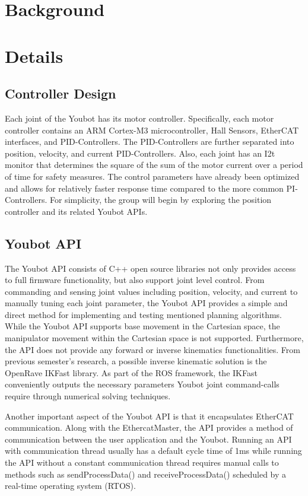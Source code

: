 \documentclass[titlepage]{article}
\begin{document}
\section{Background}
\section{Details}
\subsection{Controller Design}
Each joint of the Youbot has its motor controller. Specifically, each motor controller contains an ARM Cortex-M3 microcontroller, Hall Sensors, EtherCAT interfaces, and PID-Controllers. The PID-Controllers are further separated into position, velocity, and current PID-Controllers. Also, each joint has an I2t monitor that determines the square of the sum of the motor current over a period of time for safety measures. The control parameters have already been optimized and allows for relatively faster response time compared to the more common PI-Controllers. For simplicity, the group will begin by exploring the position controller and its related Youbot APIs.
\subsection{Youbot API}
The Youbot API consists of C++ open source libraries not only provides access to full firmware functionality, but also support joint level control. From commanding and sensing joint values including position, velocity, and current to manually tuning each joint parameter, the Youbot API provides a simple and direct method for implementing and testing mentioned planning algorithms. While the Youbot API supports base movement in the Cartesian space, the manipulator movement within the Cartesian space is not supported. Furthermore, the API does not provide any forward or inverse kinematics functionalities. From previous semester’s research, a possible inverse kinematic solution is the OpenRave IKFast library.   As part of the ROS framework, the IKFast conveniently outputs the necessary parameters Youbot joint command-calls require through numerical solving techniques.

Another important aspect of the Youbot API is that it encapsulates EtherCAT communication. Along with the EthercatMaster, the API provides a method of communication between the user application and the Youbot. Running an API with communication thread usually has a default cycle time of 1ms while running the API without a constant communication thread requires manual calls to methods such as sendProcessData() and receiveProcessData() scheduled by a real-time operating system (RTOS).
\end{document}
